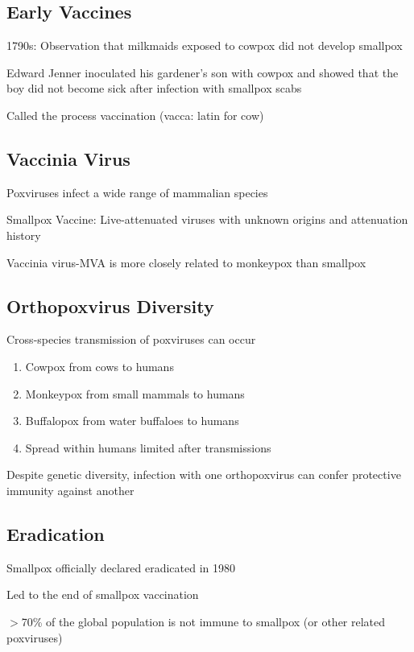 \documentclass{notes}
\begin{document}
\subsection{Early Vaccines}

1790s: Observation that milkmaids exposed to cowpox did not develop smallpox

Edward Jenner inoculated his gardener's son with cowpox and showed that the boy did not become sick after infection with smallpox scabs

\tab Called the process vaccination (vacca: latin for cow)

\subsection{Vaccinia Virus}

Poxviruses infect a wide range of mammalian species

Smallpox Vaccine: Live-attenuated viruses with unknown origins and attenuation history

\tab Vaccinia virus-MVA is more closely related to monkeypox than smallpox

\subsection{Orthopoxvirus Diversity}

Cross-species transmission of poxviruses can occur

\begin{enumerate}
    \item Cowpox from cows to humans
    \item Monkeypox from small mammals to humans
    \item Buffalopox from water buffaloes to humans
    \item Spread within humans limited after transmissions
\end{enumerate}

Despite genetic diversity, infection with one orthopoxvirus can confer protective immunity against another

\subsection{Eradication}

Smallpox officially declared eradicated in 1980

\tab Led to the end of smallpox vaccination

\tab \tab \(>\)70\% of the global population is not immune to smallpox (or other related poxviruses)
\end{document}
